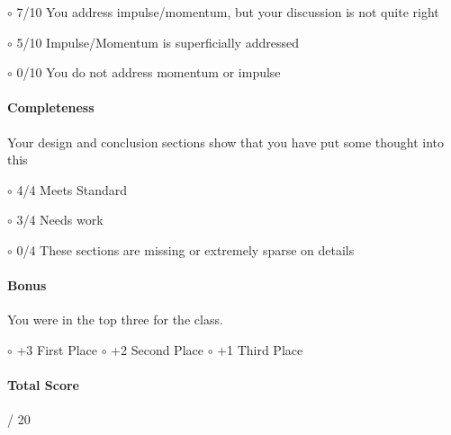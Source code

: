 \documentclass[10pt]{exam}
\begin{document}
$\circ$ 7/10 You address impulse/momentum, but your discussion is not quite right \hfill

$\circ$ 5/10 Impulse/Momentum is superficially addressed \hfill

$\circ$ 0/10 You do not address momentum or impulse \hfill


\paragraph{Completeness}  Your design and conclusion sections show that you have put some thought into this

$\circ$ 4/4 Meets Standard \hfill

$\circ$ 3/4 Needs work \hfill

$\circ$ 0/4 These sections are missing or extremely sparse on details \hfill



\paragraph{Bonus}  You were in the top three for the class.

$\circ$ +3 First Place \hfill
$\circ$ +2 Second Place \hfill
$\circ$ +1 Third Place \hfill{}



\paragraph{Total Score} \fillin[][5em] / 20
\end{document}
